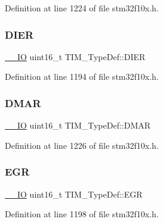 Definition at line 1224 of file stm32f10x.\+h.

\mbox{\label{struct_t_i_m___type_def_a25b145e57a694bb384eee08fcd107c3a}} 
\subsubsection{\texorpdfstring{D\+I\+ER}{DIER}}
{\footnotesize\ttfamily \hyperlink{core__sc300_8h_aec43007d9998a0a0e01faede4133d6be}{\+\_\+\+\_\+\+IO} uint16\+\_\+t T\+I\+M\+\_\+\+Type\+Def\+::\+D\+I\+ER}



Definition at line 1194 of file stm32f10x.\+h.

\mbox{\label{struct_t_i_m___type_def_a4e0fbb52e6dd4bdabcb3f3b2f4bae40c}} 
\subsubsection{\texorpdfstring{D\+M\+AR}{DMAR}}
{\footnotesize\ttfamily \hyperlink{core__sc300_8h_aec43007d9998a0a0e01faede4133d6be}{\+\_\+\+\_\+\+IO} uint16\+\_\+t T\+I\+M\+\_\+\+Type\+Def\+::\+D\+M\+AR}



Definition at line 1226 of file stm32f10x.\+h.

\mbox{\label{struct_t_i_m___type_def_a724fd21b7131fb9ac78c1b661dee3a8d}} 
\subsubsection{\texorpdfstring{E\+GR}{EGR}}
{\footnotesize\ttfamily \hyperlink{core__sc300_8h_aec43007d9998a0a0e01faede4133d6be}{\+\_\+\+\_\+\+IO} uint16\+\_\+t T\+I\+M\+\_\+\+Type\+Def\+::\+E\+GR}



Definition at line 1198 of file stm32f10x.\+h.

\mbox{\label{struct_t_i_m___type_def_ad58e05db30d309608402a69d87c36505}} 
